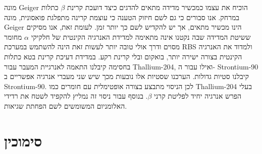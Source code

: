 \documentclass{article}
\begin{document}
מונה
\textenglish{Geiger}
הוכיח את עצמו כמכשיר מדידה מתאים להדגים כיצד דועכת קרינת
$\beta$
כתלות במרחק. אנו סבורים כי גם לשם חיזוק הטענה כי עוצמת קרינה מתפלגת פואסונית, מונה
\textenglish{Geiger}
הינו מכשיר מתאים, אך יש להקדיש לשם כך יותר זמן. לעומת זאת, אנו מסיקים ששיטת המדידה שבה נקטנו אינה מתאימה למדידת האנרגיה הקינטית של חלקיקי
$\alpha$
מחומר מסוים ודרך אולי טובה יותר לעשות זאת הינה להשתמש במערכת
\textenglish{RBS}
ולמדוד את האנרגיה הקינטית בצורה ישירה יותר, בואקום ובלי קרינת רקע.
במדידת דעיכת קרינת בטא כתלות בחסימה קיבלנו התאמה לאנרגיית המעבר עבור 
\textenglish{Thallium-204},
ואילו עבור ה-
\textenglish{Strontium-90}
קיבלנו סטיות גדולות.
הערכנו שסטיות אלו נובעות מכך שיש שני מעברי אנרגיה אפשריים ב
\textenglish{Strontium-90}.
לכן הניסוי מתבצע בצורה אופטימלית עם חומרים כמו 
\textenglish{Thallium-204}
בעלי הפרש אנרגיה יחיד לפליטת קרני 
$\beta$.
בנוסף עבור ניסוי זה נמליץ להקפיד לשטח את רדידי האלומניום המשומשים לשם הפחתת שגיאות.
\section*{
סימוכין
}

\begin{english}
\printbibliography[heading=none]
\end{english}
\end{document}

